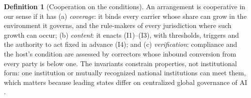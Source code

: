 \documentclass[letterpaper]{article} %
\theoremstyle{definition}
\newtheorem{definition}{Definition}
\begin{document}
\begin{definition}[Cooperation on the conditions]\label{def:coop}
An arrangement is cooperative in our sense if it has (a) \emph{coverage}: it binds every carrier whose share can grow in the environment it governs, and the rule-makers of every jurisdiction where such growth can occur; (b) \emph{content}: it enacts (I1)--(I3), with thresholds, triggers and the authority to act fixed in advance (I4); and (c) \emph{verification}: compliance and the host's condition are assessed by correctors whose inbound conversion from every party is below one. The invariants constrain properties, not institutional form: one institution or mutually recognized national institutions can meet them, which matters because leading states differ on centralized global governance of AI \citep{kratsios2025}.
\end{definition}
\end{document}

